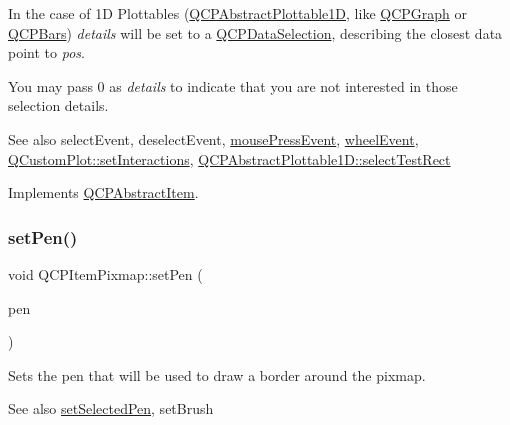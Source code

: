 In the case of 1D Plottables (\hyperlink{classQCPAbstractPlottable1D}{Q\+C\+P\+Abstract\+Plottable1D}, like \hyperlink{classQCPGraph}{Q\+C\+P\+Graph} or \hyperlink{classQCPBars}{Q\+C\+P\+Bars}) {\itshape details} will be set to a \hyperlink{classQCPDataSelection}{Q\+C\+P\+Data\+Selection}, describing the closest data point to {\itshape pos}.

You may pass 0 as {\itshape details} to indicate that you are not interested in those selection details.

\begin{DoxySeeAlso}{See also}
select\+Event, deselect\+Event, \hyperlink{classQCPLayerable_af6567604818db90f4fd52822f8bc8376}{mouse\+Press\+Event}, \hyperlink{classQCPLayerable_a47dfd7b8fd99c08ca54e09c362b6f022}{wheel\+Event}, \hyperlink{classQCustomPlot_a5ee1e2f6ae27419deca53e75907c27e5}{Q\+Custom\+Plot\+::set\+Interactions}, \hyperlink{classQCPAbstractPlottable1D_a22377bf6e57ab7eedbc9e489250c6ded}{Q\+C\+P\+Abstract\+Plottable1\+D\+::select\+Test\+Rect} 
\end{DoxySeeAlso}


Implements \hyperlink{classQCPAbstractItem_ae41d0349d68bb802c49104afd100ba2a}{Q\+C\+P\+Abstract\+Item}.

\mbox{\label{classQCPItemPixmap_acdade1305edb4b5cae14f97fd132065f}} 
\subsubsection{\texorpdfstring{set\+Pen()}{setPen()}}
{\footnotesize\ttfamily void Q\+C\+P\+Item\+Pixmap\+::set\+Pen (\begin{DoxyParamCaption}\item[{const Q\+Pen \&}]{pen }\end{DoxyParamCaption})}

Sets the pen that will be used to draw a border around the pixmap.

\begin{DoxySeeAlso}{See also}
\hyperlink{classQCPItemPixmap_afc5e479e88e53740176ce77cb70dd67a}{set\+Selected\+Pen}, set\+Brush 
\end{DoxySeeAlso}
\mbox{\label{classQCPItemPixmap_a726b69ea4025edf48f9b29b6450548a7}} 

